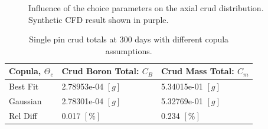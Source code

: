 \begin{figure}[H]%
    \centering
    \hspace*{-1.0em}%
    \caption[Influence of the choice parameters on the axial crud distribution.]{Influence of the choice parameters on the axial crud distribution.  Synthetic CFD result shown in purple.}%
    \label{fig:crud_copula_fam_sensi}%
\end{figure}


\begin{table}[h]
    \begin{center}
        \caption[Crud totals with different copula assumptions.]{Single pin crud totals at 300 days with different copula assumptions.}
        \begin{tabular}[h]{|l | l | l |}
            \hline
            Copula, $\Theta_c$ & Crud Boron Total: $C_B$ & Crud Mass Total: $C_m$ \\
            \hline  \hline
            Best Fit &  2.78953e-04 $[g]$ & 5.34015e-01 $[g]$ \\
            Gaussian &  2.78301e-04 $[g]$ & 5.32769e-01 $[g]$ \\
            \hline
            Rel Diff &  0.017 $[\%]$ & 0.234 $[\%]$ \\
            \hline
        \end{tabular}
        \label{tab:crud_totals_copula}
    \end{center}
\end{table}

